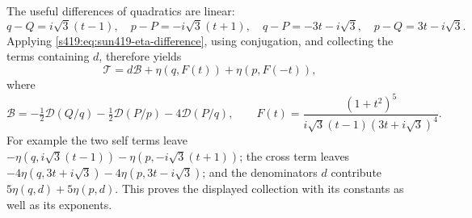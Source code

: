 \documentclass[11pt,a4paper]{article}
\theoremstyle{remark}\newtheorem{remark}[theorem]{Remark}
\numberwithin{equation}{section}
\begin{document}
The useful differences of quadratics are linear:
\[
 q-Q=i\sqrt3(t-1),\quad p-P=-i\sqrt3(t+1),\quad
 q-P=-3t-i\sqrt3,\quad p-Q=3t-i\sqrt3.
\]
Applying \eqref{s419:eq:sun419-eta-difference}, using conjugation, and
collecting the terms containing $d$, therefore yields
\begin{equation}\label{s419:eq:sun419-first-reduction}
 \mathcal T=d\mathcal B+\eta(q,F(t))+\eta(p,F(-t)),
\end{equation}
where
\[
 \mathcal B=-\tfrac12\mathcal D(Q/q)-\tfrac12\mathcal D(P/p)
                         -4\mathcal D(P/q),\qquad
 F(t)=\frac{(1+t^2)^5}
 {i\sqrt3(t-1)(3t+i\sqrt3)^4}.
\]
For example the two self terms leave
$-\eta(q,i\sqrt3(t-1))-\eta(p,-i\sqrt3(t+1))$;
the cross term leaves
$-4\eta(q,3t+i\sqrt3)-4\eta(p,3t-i\sqrt3)$;
and the denominators $d$ contribute
$5\eta(q,d)+5\eta(p,d)$. This proves the displayed collection with its
constants as well as its exponents.
\end{document}
